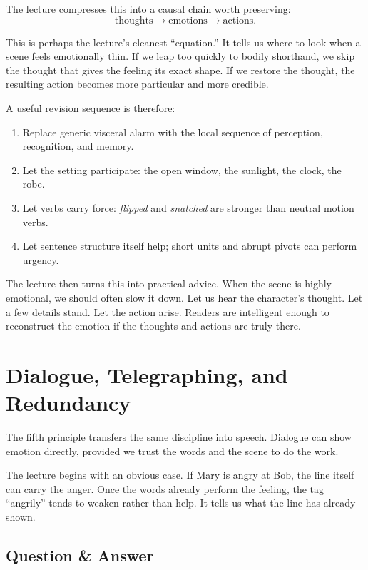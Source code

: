 The lecture compresses this into a causal chain worth preserving:
\begin{equation}
\text{thoughts} \to \text{emotions} \to \text{actions}.
\end{equation}

This is perhaps the lecture's cleanest ``equation.'' It tells us where to look when a scene feels emotionally thin. If we leap too quickly to bodily shorthand, we skip the thought that gives the feeling its exact shape. If we restore the thought, the resulting action becomes more particular and more credible.

A useful revision sequence is therefore:
\begin{enumerate}
\item Replace generic visceral alarm with the local sequence of perception, recognition, and memory.
\item Let the setting participate: the open window, the sunlight, the clock, the robe.
\item Let verbs carry force: \emph{flipped} and \emph{snatched} are stronger than neutral motion verbs.
\item Let sentence structure itself help; short units and abrupt pivots can perform urgency.
\end{enumerate}

The lecture then turns this into practical advice. When the scene is highly emotional, we should often slow it down. Let us hear the character's thought. Let a few details stand. Let the action arise. Readers are intelligent enough to reconstruct the emotion if the thoughts and actions are truly there.

\section{Dialogue, Telegraphing, and Redundancy}

The fifth principle transfers the same discipline into speech. Dialogue can show emotion directly, provided we trust the words and the scene to do the work.

The lecture begins with an obvious case. If Mary is angry at Bob, the line itself can carry the anger. Once the words already perform the feeling, the tag ``angrily'' tends to weaken rather than help. It tells us what the line has already shown.

\subsection{Question \& Answer}

